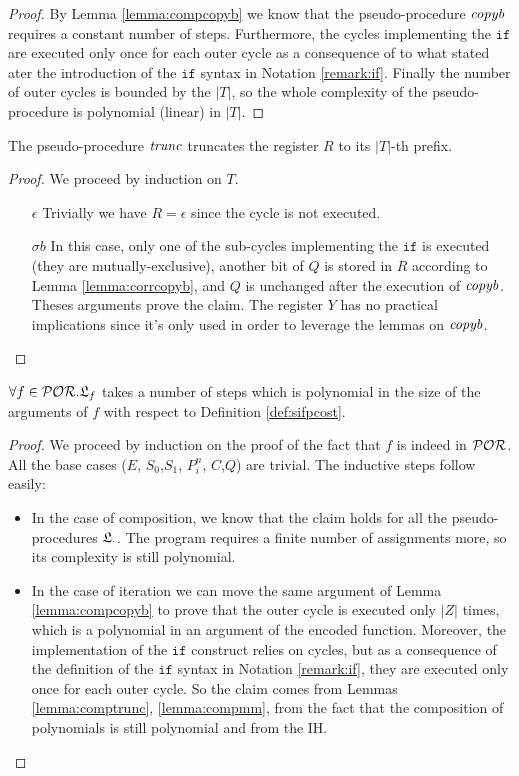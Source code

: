 \begin{proof}
By Lemma \ref{lemma:compcopyb} we know that the pseudo-procedure $\mathit{copyb}$ requires a constant number of steps. Furthermore, the cycles implementing the $\mathtt{if}$ are executed only once for each outer cycle as a consequence of to what stated ater the introduction of the $\mathtt{if}$ syntax in Notation \ref{remark:if}. Finally the number of outer cycles is bounded by the $|T|$, so the whole complexity of the pseudo-procedure is polynomial (linear) in $|T|$.
\end{proof}

\begin{lemma}
\label{lemma:corrtrunc}
The pseudo-procedure $\mathit{trunc}$ truncates the register $R$ to its $|T|$-th prefix.
\end{lemma}

\begin{proof}
We proceed by induction on $T$.
\begin{itemize}
\item[$\epsilon$] Trivially we have $R=\epsilon$ since the cycle is not executed.
\item[$\sigma b$] In this case, only one of the sub-cycles implementing the $\mathtt{if}$ is executed (they are mutually-exclusive), another bit of $Q$ is stored in $R$ according to Lemma \ref{lemma:corrcopyb}, and $Q$ is unchanged after the execution of $\mathit{copyb}$. Theses arguments prove the claim. The register $Y$ has no practical implications since it's only used in order to leverage the lemmas on $\mathit{copyb}$.
\end{itemize}
\end{proof}

\begin{lemma}
  \label{lemma:compsifpra}
$\forall f \in \mathcal{POR}. {\mathfrak L_{f}}$ takes a number of steps which is polynomial in the size of the arguments of $f$ with respect to Definition \ref{def:sifpcost}.
\end{lemma}
\begin{proof}
We proceed by induction on the proof of the fact that $f$ is indeed in $\mathcal{POR}$. All the base cases ($E$, $S_0$,$S_1$, ${P}^n_i$, $C$,$Q$) are trivial. The inductive steps follow easily:
\begin{itemize}
\item In the case of composition, we know that the claim holds for all the pseudo-procedures ${\mathfrak L_{\cdot}}$. The program requires a finite number of assignments more, so its complexity is still polynomial.
\item In the case of iteration we can move the same argument of Lemma \ref{lemma:compcopyb} to prove that the outer cycle is executed only $|Z|$ times, which is a polynomial in an argument of the encoded function. Moreover, the implementation of the $\mathtt{if}$ construct relies on cycles, but as a consequence of the definition of the $\mathtt{if}$ syntax in Notation \ref{remark:if}, they are executed only once for each outer cycle. So the claim comes from Lemmas \ref{lemma:comptrunc}, \ref{lemma:compmm}, from the fact that the composition of polynomials is still polynomial and from the IH.
\end{itemize}
\end{proof}

